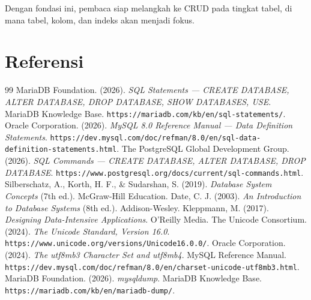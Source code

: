 \documentclass[11pt,a4paper]{article}
\begin{document}
Dengan fondasi ini, pembaca siap melangkah ke CRUD pada tingkat tabel, di mana tabel, kolom, dan indeks akan menjadi fokus.

\newpage
\section*{Referensi}

\begin{thebibliography}{99}
	 MariaDB Foundation. (2026). \textit{SQL Statements --- CREATE DATABASE, ALTER DATABASE, DROP DATABASE, SHOW DATABASES, USE}. MariaDB Knowledge Base. \texttt{https://mariadb.com/kb/en/sql-statements/}.
	 Oracle Corporation. (2026). \textit{MySQL 8.0 Reference Manual --- Data Definition Statements}. \texttt{https://dev.mysql.com/doc/refman/8.0/en/sql-data-definition-statements.html}.
	 The PostgreSQL Global Development Group. (2026). \textit{SQL Commands --- CREATE DATABASE, ALTER DATABASE, DROP DATABASE}. \texttt{https://www.postgresql.org/docs/current/sql-commands.html}.
	 Silberschatz, A., Korth, H. F., \& Sudarshan, S. (2019). \textit{Database System Concepts} (7th ed.). McGraw-Hill Education.
	 Date, C. J. (2003). \textit{An Introduction to Database Systems} (8th ed.). Addison-Wesley.
	 Kleppmann, M. (2017). \textit{Designing Data-Intensive Applications}. O'Reilly Media.
	 The Unicode Consortium. (2024). \textit{The Unicode Standard, Version 16.0}. \texttt{https://www.unicode.org/versions/Unicode16.0.0/}.
	 Oracle Corporation. (2024). \textit{The utf8mb3 Character Set and utf8mb4}. MySQL Reference Manual. \texttt{https://dev.mysql.com/doc/refman/8.0/en/charset-unicode-utf8mb3.html}.
	 MariaDB Foundation. (2026). \textit{mysqldump}. MariaDB Knowledge Base. \texttt{https://mariadb.com/kb/en/mariadb-dump/}.
\end{thebibliography}
\end{document}
